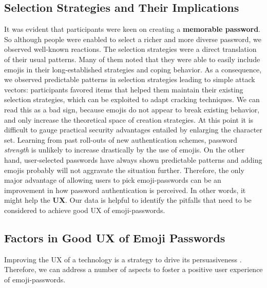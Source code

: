 \subsection{Selection Strategies and Their Implications}
It was evident that participants were keen on creating a \textbf{memorable password}. So although people were enabled to select a richer and more diverse password, we observed well-known reactions. 
The selection strategies were a direct translation of their usual patterns. Many of them noted that they were able to easily include emojis in their long-established strategies and coping behavior. As a consequence, we observed predictable patterns in selection strategies leading to simple attack vectors: participants favored items that helped them maintain their existing selection strategies, which can be exploited to adapt cracking techniques.
We can read this as a bad sign, because emojis do not appear to break existing behavior, and only increase the theoretical space of creation strategies. At this point it is difficult to gauge practical security advantages entailed by enlarging the character set. Learning from past roll-outs of new authentication schemes, password \textit{strength} is unlikely to increase drastically by the use of emojis. 
On the other hand, user-selected passwords have always shown predictable patterns and adding emojis probably will not aggravate the situation further. Therefore, the only major advantage of allowing users to pick emoji-passwords can be an improvement in how password authentication is perceived. In other words, it might help the \textbf{\gls{UX}}. Our data is helpful to identify the pitfalls that need to be considered to achieve good UX of emoji-passwords. 

\subsection{Factors in Good UX of Emoji Passwords}
Improving the UX of a technology is a strategy to drive its persuasiveness \cite{Fogg2001WhatMakesSitesCredible}. Therefore, we can address a number of aspects to foster a positive user experience of emoji-passwords.  
